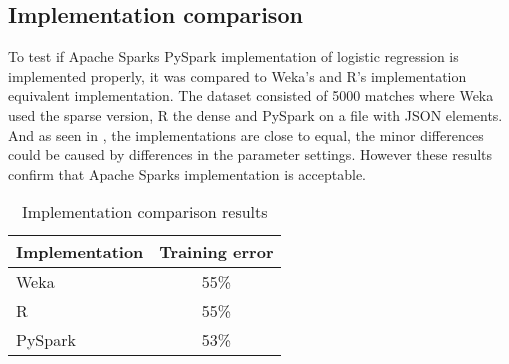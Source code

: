 \begin{figure}[!htb]
\end{figure}

\subsection{Implementation comparison}
To test if Apache Sparks PySpark implementation of logistic regression is implemented properly, it was compared to Weka's and R's implementation equivalent implementation. The dataset consisted of 5000 matches where Weka used the sparse version, R the dense and PySpark on a file with JSON elements. And as seen in , the implementations are close to equal, the minor differences could be caused by differences in the parameter settings. However these results confirm that Apache Sparks implementation is acceptable. 

\begin{table}[!htb]
  \centering
  \begin{tabular}{|l|c|}
    \hline
    Implementation  & Training error  \\
    \hline
    Weka & 55\%  \\
    R & 55\%\\
    PySpark & 53\%\\ 
    \hline
  \end{tabular}
  \caption{Implementation comparison results}
  \label{tab:impl_results}
\end{table}

